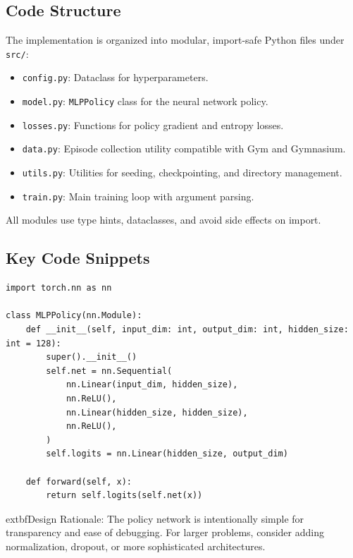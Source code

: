 \documentclass[conference]{IEEEtran}
\begin{document}
\subsection{Code Structure}

The implementation is organized into modular, import-safe Python files under \texttt{src/}:

\begin{itemize}
\item \texttt{config.py}: Dataclass for hyperparameters.
\item \texttt{model.py}: \texttt{MLPPolicy} class for the neural network policy.
\item \texttt{losses.py}: Functions for policy gradient and entropy losses.
\item \texttt{data.py}: Episode collection utility compatible with Gym and Gymnasium.
\item \texttt{utils.py}: Utilities for seeding, checkpointing, and directory management.
\item \texttt{train.py}: Main training loop with argument parsing.
\end{itemize}

All modules use type hints, dataclasses, and avoid side effects on import.

\subsection{Key Code Snippets}

\begin{lstlisting}[caption=Policy Network Implementation]
import torch.nn as nn

class MLPPolicy(nn.Module):
    def __init__(self, input_dim: int, output_dim: int, hidden_size: int = 128):
        super().__init__()
        self.net = nn.Sequential(
            nn.Linear(input_dim, hidden_size),
            nn.ReLU(),
            nn.Linear(hidden_size, hidden_size),
            nn.ReLU(),
        )
        self.logits = nn.Linear(hidden_size, output_dim)

    def forward(self, x):
        return self.logits(self.net(x))
\end{lstlisting}

	extbf{Design Rationale:} The policy network is intentionally simple for transparency and ease of debugging. For larger problems, consider adding normalization, dropout, or more sophisticated architectures.
\end{document}
